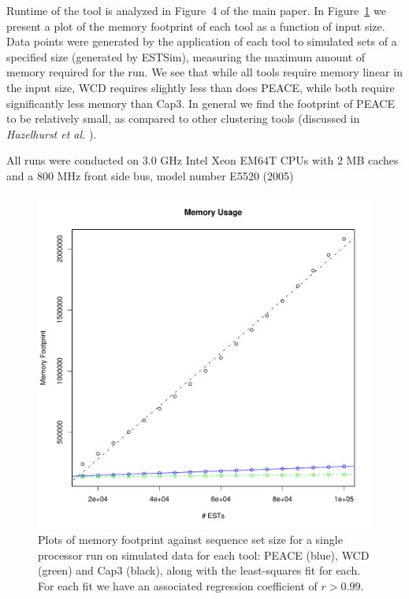 \documentclass[a4paper,12pt]{article}
\newcommand{\mc}[1]{#1}   %
\newcommand{\peace} {{\small PEACE}}
\newcommand{\wcd} {{\small WCD}}
\newcommand{\capthree} {{\small Cap3}}
\begin{document}
\begin{appendix}
\mc{Runtime of the tool is analyzed in Figure~4 of the main paper.  In
Figure~\ref{memory} we present a plot of the memory footprint of each tool
as a function of input size.  Data points were generated by the application of
each tool to simulated sets of a specified size (generated by ESTSim),
measuring the maximum amount of memory required for the run.  We see that while
all tools require memory linear in the input size, \wcd\/ requires
slightly less than does \peace, while both require significantly less
memory than \capthree.  In general we find the footprint of \peace\/
to be relatively small, as compared to other clustering tools
(discussed in {\it Hazelhurst et al.} \cite{Hazelhurst08a}).}

\mc{All runs were conducted on 3.0 GHz Intel Xeon EM64T CPUs with 2 MB
caches and a 800 MHz front side bus, model number E5520 (2005)}

\begin{figure}[tbp]
\centerline{
\includegraphics[scale=0.35]{pics.d/memory.pdf}
}
\caption{Plots of memory footprint against sequence set size for a
  single processor run on simulated data for each tool: \peace\/
  (blue), \wcd\/ (green) and \capthree\/ (black), along with the
  least-squares fit for each.  For each fit we have an associated
  regression coefficient of $r > 0.99$.}\label{memory}
\end{figure}


\end{appendix}
\end{document}
